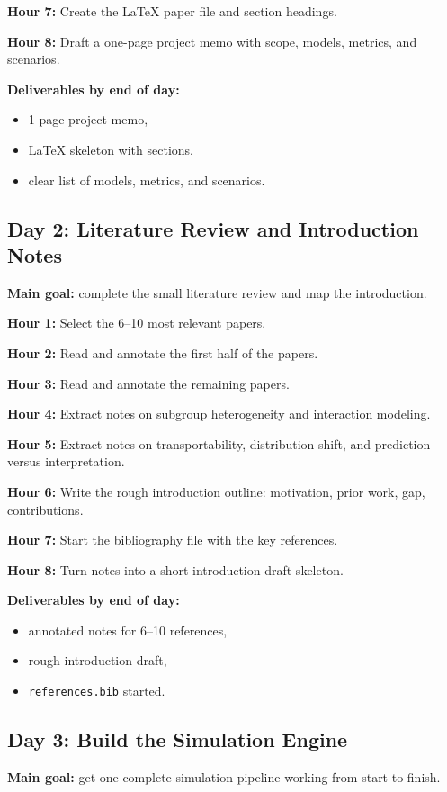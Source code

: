 \documentclass[11pt]{article}
\begin{document}
\textbf{Hour 7:} Create the LaTeX paper file and section headings.

\textbf{Hour 8:} Draft a one-page project memo with scope, models, metrics, and scenarios.

\textbf{Deliverables by end of day:}
\begin{itemize}
    \item 1-page project memo,
    \item LaTeX skeleton with sections,
    \item clear list of models, metrics, and scenarios.
\end{itemize}

\subsection*{Day 2: Literature Review and Introduction Notes}
\textbf{Main goal:} complete the small literature review and map the introduction.

\textbf{Hour 1:} Select the 6--10 most relevant papers.

\textbf{Hour 2:} Read and annotate the first half of the papers.

\textbf{Hour 3:} Read and annotate the remaining papers.

\textbf{Hour 4:} Extract notes on subgroup heterogeneity and interaction modeling.

\textbf{Hour 5:} Extract notes on transportability, distribution shift, and prediction versus interpretation.

\textbf{Hour 6:} Write the rough introduction outline: motivation, prior work, gap, contributions.

\textbf{Hour 7:} Start the bibliography file with the key references.

\textbf{Hour 8:} Turn notes into a short introduction draft skeleton.

\textbf{Deliverables by end of day:}
\begin{itemize}
    \item annotated notes for 6--10 references,
    \item rough introduction draft,
    \item \texttt{references.bib} started.
\end{itemize}

\subsection*{Day 3: Build the Simulation Engine}
\textbf{Main goal:} get one complete simulation pipeline working from start to finish.
\end{document}
